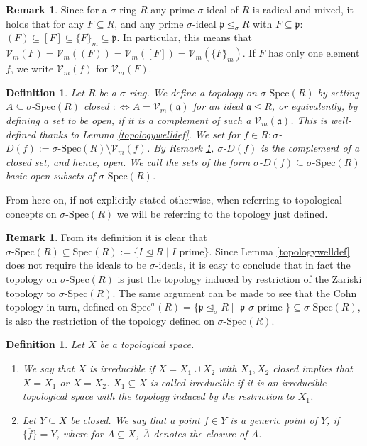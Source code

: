 \documentclass{article}
\def\Vm{\mathcal{V}_m}
\def\a{\mathfrak{a}}
\def\p{\mathfrak{p}}
\def\s{\sigma}
\def\si{\unlhd_{\sigma}}
\def\Spec{\text{Spec}}
\def\sSpec{\sigma\text{-Spec}}
\theoremstyle{plain}
\newtheorem{defn}[Satz]{Definition}
\theoremstyle{definition}
\newtheorem{rem}[Satz]{Remark}
\begin{document}
\begin{rem}\label{vmsequal}
Since for a $\s$-ring $R$ any prime $\s$-ideal of $R$ is radical and mixed, it holds that for any $F \subseteq R$, and any prime $\s$-ideal $\p \si R$ with $F \subseteq \p$:
$(F) \subseteq [F] \subseteq \{ F \}_m \subseteq \p$. In particular, this means that $\Vm(F) = \Vm((F)) = \Vm([F]) = \Vm(\{F\}_m)$. If $F$ has only one element $f$, we write $\Vm(f)$ for $\Vm(F)$.
\end{rem}

\begin{defn}\label{deftop}
Let $R$ be a $\s$-ring. We define a topology on $\sSpec(R)$ by setting $A \subseteq \sSpec(R)$ closed $:\Leftrightarrow A = \Vm(\a)$ for an ideal $\a \unlhd R$, or equivalently,
 by defining a set to be open, if it is a complement of such a $\Vm(\a)$. This is well-defined thanks to Lemma \ref{topologywelldef}.
We set for $f \in R: \s$-$ D(f):= \sSpec(R) \setminus \Vm(f)$. By Remark \ref{vmsequal}, $\s$-$D(f)$ is the complement of a closed set, and hence, open. 
We call the sets of the form $\s$-$D(f) \subseteq \sSpec(R)$ basic open subsets of $\sSpec(R)$.
\end{defn}

From here on, if not explicitly stated otherwise, when referring to topological concepts on $\sSpec(R)$ we will be referring to the topology just defined.

\begin{rem}
From its definition it is clear that $\sSpec(R) \subseteq \Spec(R):= \{ I \unlhd R \mid I \text{ prime} \}$. Since Lemma \ref{topologywelldef} does not require the ideals to be $\s$-ideals, 
it is easy to conclude that in fact the topology on $\sSpec(R)$ is just the topology induced by restriction of the Zariski topology to $\sSpec(R)$. The same argument can be made to see that the Cohn topology in turn,
defined on $\Spec^\s(R) = \{ \p \si R \mid $ $\p$ $ \s$-prime $\} \subseteq \sSpec(R)$, is also the restriction of the topology defined on $\sSpec(R)$. 
\end{rem}

\begin{defn}
Let $X$ be a topological space.
\begin{enumerate}
\item  We say that $X$ is irreducible if $X = X_1 \cup X_2$ with $X_1, X_2$ closed implies that $X = X_1$ or $X = X_2$. 
$X_1 \subseteq X$ is called irreducible if it is an irreducible topological space with the topology induced by the restriction to $X_1$.
\item Let $Y \subseteq X$ be closed. We say that a point $f \in Y$ is a generic point of $Y$, if $\overline{\{  f \} } = Y$, where for $A \subseteq X$, $\overline{A}$ denotes the closure of $A$.

\end{enumerate}
\end{defn}
\end{document}
